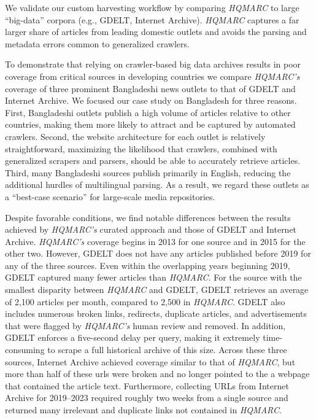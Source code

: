 \documentclass[
  letterpaper,
  DIV=11,
  numbers=noendperiod]{scrartcl}
\begin{document}
We validate our custom harvesting workflow by comparing \emph{HQMARC} to
large ``big-data'' corpora (e.g., GDELT, Internet Archive).
\emph{HQMARC} captures a far larger share of articles from leading
domestic outlets and avoids the parsing and metadata errors common to
generalized crawlers.

To demonstrate that relying on crawler-based big data archives results
in poor coverage from critical sources in developing countries we
compare \emph{HQMARC's} coverage of three prominent Bangladeshi news
outlets to that of GDELT and Internet Archive. We focused our case study
on Bangladesh for three reasons. First, Bangladeshi outlets publish a
high volume of articles relative to other countries, making them more
likely to attract and be captured by automated crawlers. Second, the
website architecture for each outlet is relatively straightforward,
maximizing the likelihood that crawlers, combined with generalized
scrapers and parsers, should be able to accurately retrieve articles.
Third, many Bangladeshi sources publish primarily in English, reducing
the additional hurdles of multilingual parsing. As a result, we regard
these outlets as a ``best-case scenario'' for large-scale media
repositories.

Despite favorable conditions, we find notable differences between the
results achieved by \emph{HQMARC's} curated approach and those of GDELT
and Internet Archive. \emph{HQMARC's} coverage begins in 2013 for one
source and in 2015 for the other two. However, GDELT does not have any
articles published before 2019 for any of the three sources. Even within
the overlapping years beginning 2019, GDELT captured many fewer articles
than \emph{HQMARC}. For the source with the smallest disparity between
\emph{HQMARC} and GDELT, GDELT retrieves an average of 2,100 articles
per month, compared to 2,500 in \emph{HQMARC}. GDELT also includes
numerous broken links, redirects, duplicate articles, and advertisements
that were flagged by \emph{HQMARC's} human review and removed. In
addition, GDELT enforces a five-second delay per query, making it
extremely time-consuming to scrape a full historical archive of this
size. Across these three sources, Internet Archive achieved coverage
similar to that of \emph{HQMARC}, but more than half of these urls were
broken and no longer pointed to the a webpage that contained the article
text. Furthermore, collecting URLs from Internet Archive for 2019--2023
required roughly two weeks from a single source and returned many
irrelevant and duplicate links not contained in \emph{HQMARC}.
\end{document}

